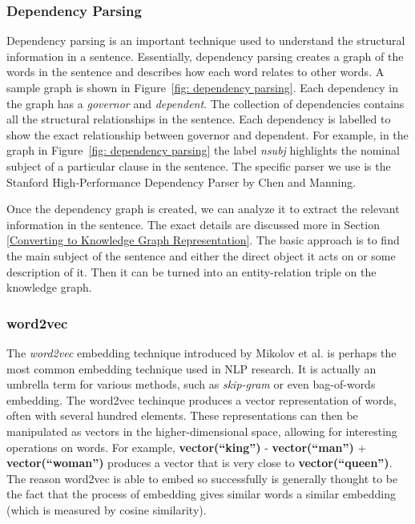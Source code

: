 \documentclass[pageno]{jpaper}
\begin{document}
\subsubsection{Dependency Parsing}
\label{Dependency Parsing}

Dependency parsing is an important technique used to understand the structural
information in a sentence. Essentially, dependency parsing creates a graph of
the words in the sentence and describes how each word relates to other words. A
sample graph is shown in Figure~\ref{fig: dependency parsing}. Each dependency
in the graph has a \textit{governor} and \textit{dependent}. The collection of
dependencies contains all the structural relationships in the sentence. Each
dependency is labelled to show the exact relationship between governor and
dependent. For example, in the graph in Figure~\ref{fig: dependency parsing} the
label \textit{nsubj} highlights the nominal subject of a particular clause in
the sentence\cite{De2014}. The specific parser we use is the Stanford
High-Performance Dependency Parser by Chen and Manning\cite{Chen2014}.

Once the dependency graph is created, we can analyze it to extract the relevant
information in the sentence. The exact details are discussed more in Section
\ref{Converting to Knowledge Graph Representation}. The basic approach is to
find the main subject of the sentence and either the direct object it acts on
or some description of it. Then it can be turned into an entity-relation triple
on the knowledge graph.

\subsubsection{word2vec}
\label{word2vec}

The \textit{word2vec} embedding technique introduced by Mikolov et al.
\cite{Mikolov2013} is perhaps the most common embedding technique used in NLP
research. It is actually an umbrella term for various methods, such as
\textit{skip-gram} or even bag-of-words embedding. The word2vec techinque
produces a vector representation of words, often with several hundred elements.
These representations can then be manipulated as vectors in the
higher-dimensional space, allowing for interesting operations on words. For
example, \textbf{vector(``king'')} - \textbf{vector(``man'')} +
\textbf{vector(``woman'')} produces a vector that is very close to
\textbf{vector(``queen'')}. The reason word2vec is able to embed so successfully
is generally thought to be the fact that the process of embedding gives
similar words a similar embedding (which is measured by cosine similarity). \\
\end{document}
